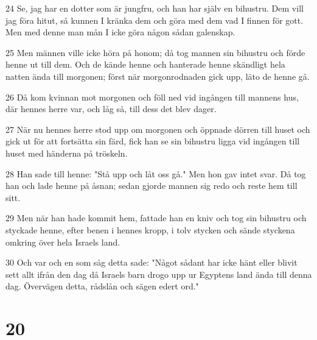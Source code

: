 \par 24 Se, jag har en dotter som är jungfru, och han har själv en bihustru. Dem vill jag föra hitut, så kunnen I kränka dem och göra med dem vad I finnen för gott. Men med denne man mån I icke göra någon sådan galenskap.
\par 25 Men männen ville icke höra på honom; då tog mannen sin bihustru och förde henne ut till dem. Och de kände henne och hanterade henne skändligt hela natten ända till morgonen; först när morgonrodnaden gick upp, läto de henne gå.
\par 26 Då kom kvinnan mot morgonen och föll ned vid ingången till mannens hus, där hennes herre var, och låg så, till dess det blev dager.
\par 27 När nu hennes herre stod upp om morgonen och öppnade dörren till huset och gick ut för att fortsätta sin färd, fick han se sin bihustru ligga vid ingången till huset med händerna på tröskeln.
\par 28 Han sade till henne: "Stå upp och låt oss gå." Men hon gav intet svar. Då tog han och lade henne på åsnan; sedan gjorde mannen sig redo och reste hem till sitt.
\par 29 Men när han hade kommit hem, fattade han en kniv och tog sin bihustru och styckade henne, efter benen i hennes kropp, i tolv stycken och sände styckena omkring över hela Israels land.
\par 30 Och var och en som såg detta sade: "Något sådant har icke hänt eller blivit sett allt ifrån den dag då Israels barn drogo upp ur Egyptens land ända till denna dag. Övervägen detta, rådslån och sägen edert ord."

\chapter{20}

